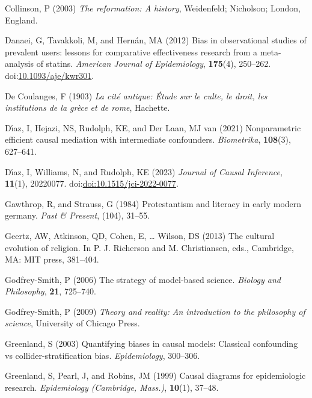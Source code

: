 \documentclass[
  single column]{article}
\newlength{\cslhangindent}
\newenvironment{CSLReferences}[2] %
 {\begin{list}{}{%
  \setlength{\itemindent}{0pt}
  \setlength{\leftmargin}{0pt}
  \setlength{\parsep}{0pt}
  \ifodd #1
   \setlength{\leftmargin}{\cslhangindent}
   \setlength{\itemindent}{-1\cslhangindent}
  \fi
  \setlength{\itemsep}{#2\baselineskip}}}
 {\end{list}}
\begin{document}
\begin{CSLReferences}{1}{0}
Collinson, P (2003) \emph{The reformation: A history}, Weidenfeld;
Nicholson; London, England.

Danaei, G, Tavakkoli, M, and Hernán, MA (2012) Bias in observational
studies of prevalent users: lessons for comparative effectiveness
research from a meta-analysis of statins. \emph{American Journal of
Epidemiology}, \textbf{175}(4), 250--262.
doi:\href{https://doi.org/10.1093/aje/kwr301}{10.1093/aje/kwr301}.

De Coulanges, F (1903) \emph{La cité antique: Étude sur le culte, le
droit, les institutions de la grèce et de rome}, Hachette.

Dı́az, I, Hejazi, NS, Rudolph, KE, and Der Laan, MJ van (2021)
Nonparametric efficient causal mediation with intermediate confounders.
\emph{Biometrika}, \textbf{108}(3), 627--641.

Dı́az, I, Williams, N, and Rudolph, KE (2023) \emph{Journal of Causal
Inference}, \textbf{11}(1), 20220077.
doi:\href{https://doi.org/doi:10.1515/jci-2022-0077}{doi:10.1515/jci-2022-0077}.

Gawthrop, R, and Strauss, G (1984) Protestantism and literacy in early
modern germany. \emph{Past \& Present}, (104), 31--55.

Geertz, AW, Atkinson, QD, Cohen, E, \ldots{} Wilson, DS (2013) The
cultural evolution of religion. In P. J. Richerson and M. Christiansen,
eds., Cambridge, MA: MIT press, 381--404.

Godfrey-Smith, P (2006) The strategy of model-based science.
\emph{Biology and Philosophy}, \textbf{21}, 725--740.

Godfrey-Smith, P (2009) \emph{Theory and reality: An introduction to the
philosophy of science}, University of Chicago Press.

Greenland, S (2003) Quantifying biases in causal models: Classical
confounding vs collider-stratification bias. \emph{Epidemiology},
300--306.

Greenland, S, Pearl, J, and Robins, JM (1999) Causal diagrams for
epidemiologic research. \emph{Epidemiology (Cambridge, Mass.)},
\textbf{10}(1), 37--48.


\end{CSLReferences}
\end{document}

